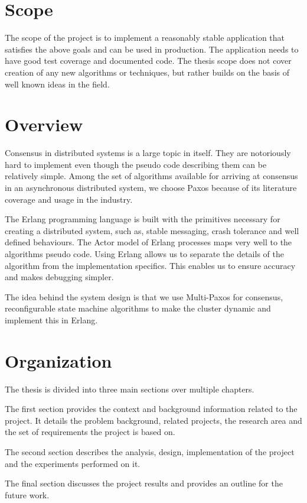 \section{Scope}

The scope of the project is to implement a reasonably stable application that
satisfies the above goals and can be used in production. The application needs
to have good test coverage and documented code. The thesis scope does not cover
creation of any new algorithms or techniques, but rather builds on the basis of
well known ideas in the field.

\section{Overview}

Consensus in distributed systems is a large topic in itself. They are
notoriously hard to implement even though the pseudo code describing them can be
relatively simple. Among the set of algorithms available for arriving at
consensus in an asynchronous distributed system, we choose Paxos because of its
literature coverage and usage in the industry.

The Erlang programming language is built with the primitives necessary for
creating a distributed system, such as, stable messaging, crash tolerance and
well defined behaviours. The Actor model of Erlang processes maps very well to 
the algorithms pseudo code. Using Erlang allows us to separate the details of
the algorithm from the implementation specifics. This enables us to ensure
accuracy and makes debugging simpler.

The idea behind the system design is that we use Multi-Paxos for consensus,
reconfigurable state machine algorithms to make the cluster dynamic and
implement this in Erlang.

\section{Organization}
The thesis is divided into three main sections over multiple chapters.

The first section provides the context and background information related to the
project. It details the problem background, related projects, the research
area and the set of requirements the project is based on.

The second section describes the analysis, design, implementation of the project
and the experiments performed on it.

The final section discusses the project results and provides an outline for
the future work.

